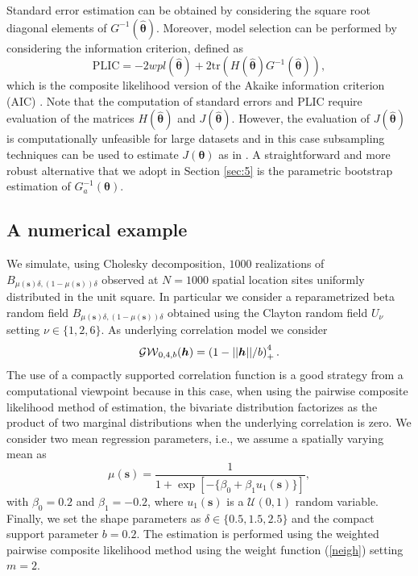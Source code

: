 \documentclass[times,sort&compress,3p]{elsarticle}
\theoremstyle{plain}%
\theoremstyle{definition}
\def\ss{\bm{s}}
\def\hh{\bm{h}}
\begin{document}
Standard error estimation can be obtained by considering the square root diagonal  elements of $G^{-1}(\widehat{\bm{\theta}})$.
Moreover, model selection can be performed by considering  the information criterion, defined as
\begin{equation*}\label{plic}
\mbox{PLIC}= - 2wpl(\hat{\bm{\theta}})  + 2\mathrm{tr}(
H(\hat{\bm{\theta}})G^{-1}(\hat{\bm{\theta}})),%
\end{equation*}
which is the composite likelihood version of
the Akaike information
criterion (AIC) %
\citep{Varin:Vidoni:2005}.
Note that the computation of standard errors and  \mbox{PLIC} %
 require  evaluation of the matrices $H(\hat{\bm{\theta}})$ and $J(\hat{\bm{\theta}})$. However, the
evaluation  of $J(\hat{\bm{\theta}})$ is  computationally
unfeasible for large datasets and  in this case subsampling
techniques can be used  to estimate $J(\bm{\theta})$ as in \citep{Bevilacqua2012, Heagerty:Lele:1998}.
A straightforward  and  more robust alternative that we adopt in  Section \ref{sec:5} is  the parametric bootstrap estimation of $G^{-1}_a(\bm{\theta})$.




\subsection{A numerical example}\label{spatial_settings}

We simulate, using Cholesky decomposition, $1000$ realizations of $B_{\mu(\ss)\delta, (1-\mu(\ss))\delta}$
observed at $N=1000$ spatial location sites uniformly distributed in the unit square.
In particular we consider a reparametrized beta random field
$B_{\mu(\ss)\delta, (1-\mu(\ss))\delta}$ obtained using the Clayton random field $U_{\nu}$
setting $\nu\in\{1, 2, 6\}$.
As  underlying correlation model we consider
\begin{equation}\label{askey}
{\cal GW}_{0,4, b}(\hh)=	\left(1- ||\hh||/b\right)^4_+.
\end{equation}
The use of a compactly supported correlation function is a good strategy from a computational viewpoint because in this case, when using the pairwise composite likelihood method of estimation,
the bivariate distribution factorizes as the product of two marginal distributions when the underlying correlation is zero.
We consider two mean regression parameters, i.e., we assume a spatially varying mean as
$$\mu(\ss )=\dfrac{1}{1+\exp \left[ -\{\beta_0+\beta_1 u_1( \ss)\} \right]},$$
\noindent with $\beta_0=0.2$ and $\beta_1=-0.2$, where $u_1( \ss )$ is  a $\mathcal{U}(0,1)$ random variable. Finally, we set the  shape parameters as $\delta\in\{0.5,1.5,2.5\}$ and the compact support  parameter $b=0.2$.
The estimation is performed using the weighted pairwise composite likelihood method using the weight function  (\ref{neigh}) setting $m=2$.
\end{document}
